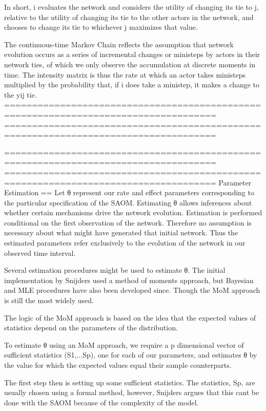 In short, i evaluates the network and considers the utility of changing its tie to j, relative to the utility of changing its tie to the other actors in the network, and chooses to change its tie to whichever j maximizes that value.

The continuous-time Markov Chain reflects the assumption that network evolution occurs as a series of incremental changes or ministeps by actors in their network ties, of which we only observe the accumulation at discrete moments in time. The intensity matrix is thus the rate at which an actor takes ministeps multiplied by the probability that, if i does take a ministep, it makes a change to the yij tie.
====================================================================================
====================================================================================

====================================================================================
====================================================================================
Parameter Estimation
==
Let θ represent our rate and effect parameters corresponding to the particular specification of the SAOM. Estimating θ allows inferences about whether certain mechanisms drive the network evolution. Estimation is performed conditional on the first observation of the network. Therefore no assumption is necessary about what might have generated that initial network. Thus the estimated parameters refer exclusively to the evolution of the network in our observed time interval.

Several estimation procedures might be used to estimate θ. The initial implementation by Snijders used a method of moments approach, but Bayesian and MLE procedures have also been developed since. Though the MoM approach is still the most widely used. 

The logic of the MoM approach is based on the idea that the expected values of statistics depend on the parameters of the distribution. 

To estimate θ using an MoM approach, we require a p dimensional vector of sufficient statistics (S1,...Sp), one for each of our parameters, and estimates θ by the value  for which the expected values equal their sample counterparts. 

The first step then is setting up some sufficient statistics. The statistics, Sp, are usually chosen using a formal method, however, Snijders argues that this cant be done with the SAOM because of the complexity of the model.

